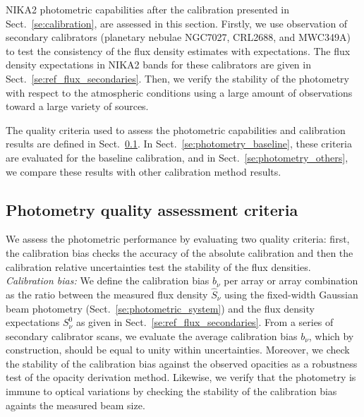 %

NIKA2 photometric capabilities after the calibration presented in
Sect.~\ref{se:calibration}, are assessed in this section. Firstly,
we use observation of secondary calibrators (planetary nebulae NGC7027, CRL2688, and
MWC349A) to test the consistency of the flux density estimates with
expectations. The flux density expectations
in NIKA2 bands for these calibrators are given in
Sect.~\ref{se:ref_flux_secondaries}. Then,
we verify the stability of the photometry with
respect to the atmospheric conditions using a large amount of
observations toward a large variety of sources. 

The quality criteria used to assess the photometric
capabilities and calibration results are defined in
Sect.~\ref{se:photometry_criteria}.
In Sect.~\ref{se:photometry_baseline}, these criteria are evaluated
for the baseline calibration, and in Sect.~\ref{se:photometry_others},
we compare these results with other calibration method results. 


\subsection{Photometry quality assessment criteria}
\label{se:photometry_criteria}

We assess the photometric performance by evaluating two
quality criteria: first, the calibration bias checks the accuracy of
the absolute calibration and then the calibration relative
uncertainties test the stability of the flux densities. \\

\noindent \emph{Calibration bias: }We define the calibration bias
$b_{\nu}$ per array or array combination as
the ratio between the measured flux density $\hat{S}_{\nu}$ using the
fixed-width Gaussian beam photometry
(Sect.~\ref{se:photometric_system}) and the flux density
expectations $S^{0}_{\nu}$ as given in
Sect.~\ref{se:ref_flux_secondaries}. From a series of
secondary calibrator scans, we evaluate the average calibration bias
$b_{\nu}$, which by construction, should be equal to
unity within uncertainties.
Moreover, we check the stability of the calibration bias against
the observed opacities as a robustness test of the
opacity derivation method. Likewise, we verify that the photometry is
immune to optical variations by checking the stability of the
calibration bias againts the measured beam size.\\

